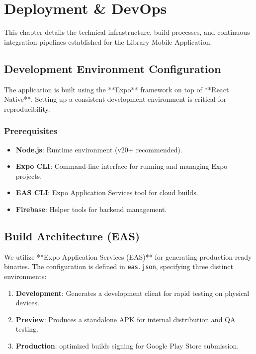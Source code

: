 \documentclass[12pt,a4paper]{article}
\begin{document}
\section{Deployment \& DevOps}

This chapter details the technical infrastructure, build processes, and continuous integration pipelines established for the Library Mobile Application.

\subsection{Development Environment Configuration}
The application is built using the **Expo** framework on top of **React Native**. Setting up a consistent development environment is critical for reproducibility.

\subsubsection{Prerequisites}
\begin{itemize}
    \item \textbf{Node.js}: Runtime environment (v20+ recommended).
    \item \textbf{Expo CLI}: Command-line interface for running and managing Expo projects.
    \item \textbf{EAS CLI}: Expo Application Services tool for cloud builds.
    \item \textbf{Firebase}: Helper tools for backend management.
\end{itemize}

\subsection{Build Architecture (EAS)}
We utilize **Expo Application Services (EAS)** for generating production-ready binaries. The configuration is defined in \texttt{eas.json}, specifying three distinct environments:

\begin{enumerate}
    \item \textbf{Development}: Generates a development client for rapid testing on physical devices.
    \item \textbf{Preview}: Produces a standalone APK for internal distribution and QA testing.
    \item \textbf{Production}: optimized builds signing for Google Play Store submission.
\end{enumerate}
\end{document}
